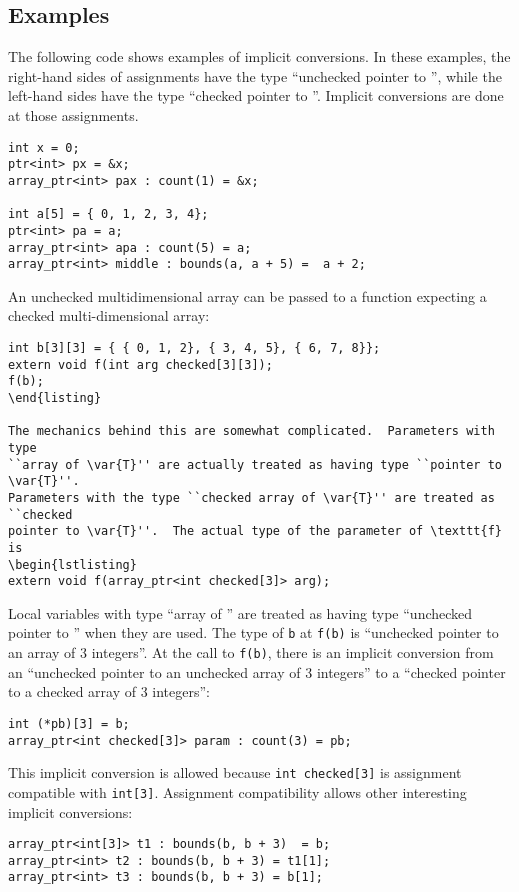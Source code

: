 \subsection{Examples}

The following code shows examples of implicit conversions.  In these examples,
the right-hand sides of assignments have the type ``unchecked pointer to
'', while the left-hand sides have the type ``checked pointer to
''.  Implicit conversions are done at those assignments.
\begin{lstlisting}
int x = 0;
ptr<int> px = &x;
array_ptr<int> pax : count(1) = &x;

int a[5] = { 0, 1, 2, 3, 4};
ptr<int> pa = a;
array_ptr<int> apa : count(5) = a;
array_ptr<int> middle : bounds(a, a + 5) =  a + 2;
\end{lstlisting}

An unchecked multidimensional array can be passed to a function expecting
a checked multi-dimensional array:
\begin{lstlisting}
int b[3][3] = { { 0, 1, 2}, { 3, 4, 5}, { 6, 7, 8}};
extern void f(int arg checked[3][3]);
f(b);
\end{listing}

The mechanics behind this are somewhat complicated.  Parameters with type
``array of \var{T}'' are actually treated as having type ``pointer to \var{T}''.
Parameters with the type ``checked array of \var{T}'' are treated as ``checked
pointer to \var{T}''.  The actual type of the parameter of \texttt{f} is
\begin{lstlisting}
extern void f(array_ptr<int checked[3]> arg);
\end{lstlisting}
Local variables with type ``array of '' are treated as having
type ``unchecked pointer to '' when they are used.  The type of
\texttt{b} at \texttt{f(b)} is ``unchecked pointer to an array of 3 integers''.
At the call to  \texttt{f(b)}, there is an implicit conversion from an
``unchecked pointer to an unchecked array of 3 integers'' to a ``checked pointer
to a checked array of 3 integers'':
\begin{lstlisting}
int (*pb)[3] = b;
array_ptr<int checked[3]> param : count(3) = pb;
\end{lstlisting}
This implicit conversion is allowed because \verb|int checked[3]| is assignment
compatible with \verb|int[3]|.  Assignment compatibility allows other
interesting implicit conversions:
\begin{lstlisting}
array_ptr<int[3]> t1 : bounds(b, b + 3)  = b;
array_ptr<int> t2 : bounds(b, b + 3) = t1[1];
array_ptr<int> t3 : bounds(b, b + 3) = b[1];
\end{lstlisting}

